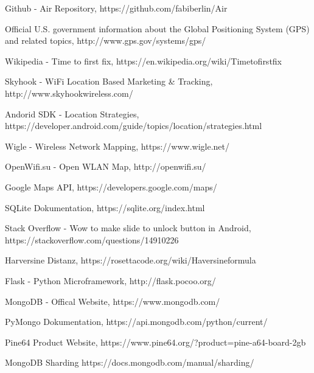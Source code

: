 \documentclass[11pt,a4paper]{article}
\begin{document}
\begin{thebibliography}{99}

 Github - Air Repository, https://github.com/fabiberlin/Air

 Official U.S. government information about the Global Positioning System (GPS) and related topics, http://www.gps.gov/systems/gps/

 Wikipedia - Time to first fix, https://en.wikipedia.org/wiki/Time\textunderscore to\textunderscore first\textunderscore fix

 Skyhook - WiFi Location Based Marketing \& Tracking, http://www.skyhookwireless.com/

 Andorid SDK - Location Strategies, https://developer.android.com/guide/topics/location/strategies.html

 Wigle - Wireless Network Mapping, https://www.wigle.net/

 OpenWifi.su - Open WLAN Map, http://openwifi.su/

 Google Maps API, https://developers.google.com/maps/

 SQLite Dokumentation, https://sqlite.org/index.html

 Stack Overflow - Wow to make slide to unlock button in Android, https://stackoverflow.com/questions/14910226

 Harversine Distanz, 
https://rosettacode.org/wiki/Haversine\textunderscore formula

 Flask - Python Microframework,  http://flask.pocoo.org/

 MongoDB - Offical Website, https://www.mongodb.com/

 PyMongo Dokumentation, https://api.mongodb.com/python/current/

 Pine64 Product Website, https://www.pine64.org/?product=pine-a64-board-2gb

 MongoDB Sharding https://docs.mongodb.com/manual/sharding/


\end{thebibliography}
\end{document}
